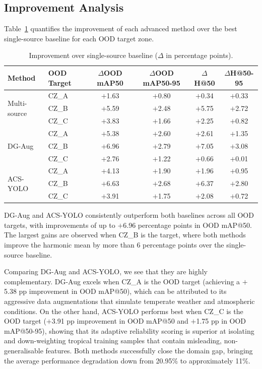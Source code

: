 \documentclass[12pt,a4paper]{article}
\begin{document}
\subsection{Improvement Analysis}

Table~\ref{tab:improvement} quantifies the improvement of each advanced method over the best single-source baseline for each OOD target zone.

\begin{table}[H]
\centering
\caption{Improvement over single-source baseline ($\Delta$ in percentage points).}
\label{tab:improvement}
\small
\begin{tabular}{llcccc}
\toprule
\textbf{Method} & \textbf{OOD Target} & \textbf{$\Delta$OOD mAP50} & \textbf{$\Delta$OOD mAP50-95} & \textbf{$\Delta$H@50} & \textbf{$\Delta$H@50-95} \\
\midrule
\multirow{3}{*}{Multi-source}
 & CZ\_A & $+$1.63 & $+$0.80 & $+$0.34 & $+$0.33 \\
 & CZ\_B & $+$5.59 & $+$2.48 & $+$5.75 & $+$2.72 \\
 & CZ\_C & $+$3.83 & $+$1.66 & $+$2.25 & $+$0.82 \\
\midrule
\multirow{3}{*}{DG-Aug}
 & CZ\_A & $+$5.38 & $+$2.60 & $+$2.61 & $+$1.35 \\
 & CZ\_B & $+$6.96 & $+$2.79 & $+$7.05 & $+$3.08 \\
 & CZ\_C & $+$2.76 & $+$1.22 & $+$0.66 & $+$0.01 \\
\midrule
\multirow{3}{*}{ACS-YOLO}
 & CZ\_A & $+$4.13 & $+$1.90 & $+$1.96 & $+$0.95 \\
 & CZ\_B & $+$6.63 & $+$2.68 & $+$6.37 & $+$2.80 \\
 & CZ\_C & $+$3.91 & $+$1.75 & $+$2.08 & $+$0.72 \\
\bottomrule
\end{tabular}
\end{table}

DG-Aug and ACS-YOLO consistently outperform both baselines across all OOD targets, with improvements of up to $+$6.96 percentage points in OOD mAP@50. The largest gains are observed when CZ\_B is the target, where both methods improve the harmonic mean by more than 6 percentage points over the single-source baseline.

Comparing DG-Aug and ACS-YOLO, we see that they are highly complementary. DG-Aug excels when CZ\_A is the OOD target (achieving a $+$5.38 pp improvement in OOD mAP@50), which can be attributed to its aggressive data augmentations that simulate temperate weather and atmospheric conditions. On the other hand, ACS-YOLO performs best when CZ\_C is the OOD target ($+$3.91 pp improvement in OOD mAP@50 and $+$1.75 pp in OOD mAP@50-95), showing that its adaptive reliability scoring is superior at isolating and down-weighting tropical training samples that contain misleading, non-generalisable features. Both methods successfully close the domain gap, bringing the average performance degradation down from 20.95\% to approximately 11\%.
\end{document}
